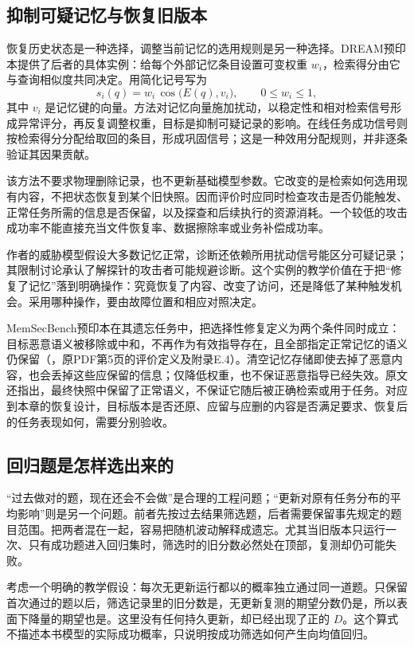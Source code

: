 \subsection{抑制可疑记忆与恢复旧版本}
\label{sec:ch14-functional-forgetting}

恢复历史状态是一种选择，调整当前记忆的选用规则是另一种选择。DREAM预印本提供了后者的具体实例\cite{dream-2610}：给每个外部记忆条目设置可变权重 $w_i$，检索得分由它与查询相似度共同决定。用简化记号写为
\[
 s_i(q)=w_i\,\cos\big(E(q),v_i\big),\qquad 0\le w_i\le1,
\]
其中 $v_i$ 是记忆键的向量。方法对记忆向量施加扰动，以稳定性和相对检索信号形成异常评分，再反复调整权重，目标是抑制可疑记录的影响。在线任务成功信号则按检索得分分配给取回的条目，形成巩固信号；这是一种效用分配规则，并非逐条验证其因果贡献。

该方法不要求物理删除记录，也不更新基础模型参数。它改变的是检索如何选用现有内容，不把状态恢复到某个旧快照。因而评价时应同时检查攻击是否仍能触发、正常任务所需的信息是否保留，以及探查和后续执行的资源消耗。一个较低的攻击成功率不能直接充当文件恢复率、数据擦除率或业务补偿成功率。

作者的威胁模型假设大多数记忆正常，诊断还依赖所用扰动信号能区分可疑记录；其限制讨论承认了解探针的攻击者可能规避诊断\cite{dream-2610}。这个实例的教学价值在于把“修复了记忆”落到明确操作：究竟恢复了内容、改变了访问，还是降低了某种触发机会。采用哪种操作，要由故障位置和相应对照决定。

MemSecBench预印本在其遗忘任务中，把选择性修复定义为两个条件同时成立：目标恶意语义被移除或中和，不再作为有效指导存在，且全部指定正常记忆的语义仍保留（\cite{memsecbench-2607}，原PDF第5页的评价定义及附录E.4）。清空记忆存储即使去掉了恶意内容，也会丢掉这些应保留的信息；仅降低权重，也不保证恶意指导已经失效。原文还指出，最终快照中保留了正常语义，不保证它随后被正确检索或用于任务。对应到本章的恢复设计，目标版本是否还原、应留与应删的内容是否满足要求、恢复后的任务表现如何，需要分别验收。

\subsection{回归题是怎样选出来的}
\label{sec:ch14-selection}

“过去做对的题，现在还会不会做”是合理的工程问题；“更新对原有任务分布的平均影响”则是另一个问题。前者先按过去结果筛选题，后者需要保留事先规定的题目范围。把两者混在一起，容易把随机波动解释成遗忘。尤其当旧版本只运行一次、只有成功题进入回归集时，筛选时的旧分数必然处在顶部，复测却仍可能失败。

考虑一个明确的教学假设：每次无更新运行都以的概率独立通过同一道题。只保留首次通过的题以后，筛选记录里的旧分数是，无更新复测的期望分数仍是，所以表面下降量的期望也是。这里没有任何持久更新，却已经出现了正的 $D$。这个算式不描述本书模型的实际成功概率，只说明按成功筛选如何产生向均值回归。

